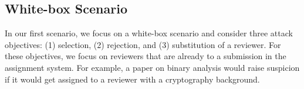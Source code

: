\documentclass[letterpaper,twocolumn,10pt]{article}
\begin{document}
\begin{table}[b]
\centering
\footnotesize
\vspace{-1em}
\caption{\textbf{Feature-space search.} We compare our attack with two baselines: hill climbing and morphing. For this comparison, we consider three attack objectives: (1) selecting, (2) rejecting, and (3) substituting of reviewers.}
\label{table:feature-space-search-strategy}
\vspace{-0.1cm}
\end{table} \subsection{White-box Scenario}

In our first scenario, we focus on a white-box scenario and consider three attack objectives: (1) selection, (2) rejection, and (3) substitution of a reviewer. For these objectives, we focus on reviewers that are already  to a submission in the assignment system. For example, a paper on binary analysis would raise suspicion if it would get assigned to a reviewer with a cryptography background.
\end{document}
